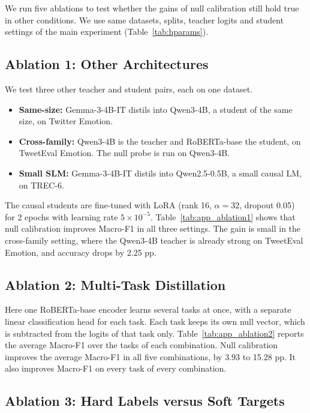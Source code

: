 \documentclass[11pt]{article}
\begin{document}
We run five ablations to test whether the gains of null calibration still hold true in other conditions.
We use same datasets, splits, teacher logits and student settings of the main experiment (Table~\ref{tab:hparams}).

\subsection{Ablation 1: Other Architectures}
\label{app:abl_arch}

We test three other teacher and student pairs, each on one dataset.
\begin{itemize}
    \item \textbf{Same-size:} Gemma-3-4B-IT distils into Qwen3-4B, a student of the same size, on Twitter Emotion.
    \item \textbf{Cross-family:} Qwen3-4B is the teacher and RoBERTa-base the student, on TweetEval Emotion. The null probe is run on Qwen3-4B.
    \item \textbf{Small SLM:} Gemma-3-4B-IT distils into Qwen2.5-0.5B, a small causal LM, on TREC-6.
\end{itemize}
The causal students are fine-tuned with LoRA (rank 16, $\alpha = 32$, dropout 0.05) for 2 epochs with learning rate $5 \times 10^{-5}$.
Table~\ref{tab:app_ablation1} shows that null calibration improves Macro-F1 in all three settings.
The gain is small in the cross-family setting, where the Qwen3-4B teacher is already strong on TweetEval Emotion, and accuracy drops by 2.25 pp.



\subsection{Ablation 2: Multi-Task Distillation}
\label{app:abl_multitask}

Here one RoBERTa-base encoder learns several tasks at once, with a separate linear classification head for each task.
Each task keeps its own null vector, which is subtracted from the logits of that task only.
Table~\ref{tab:app_ablation2} reports the average Macro-F1 over the tasks of each combination.
Null calibration improves the average Macro-F1 in all five combinations, by 3.93 to 15.28 pp.
It also improves Macro-F1 on every task of every combination.



\subsection{Ablation 3: Hard Labels versus Soft Targets}
\label{app:abl_hard_soft}
\end{document}

